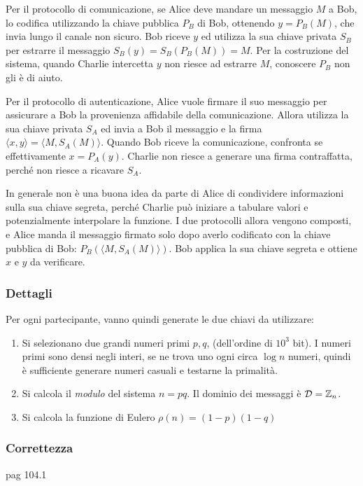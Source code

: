 Per il protocollo di comunicazione, se Alice deve mandare un messaggio $M$ a Bob,
lo codifica utilizzando la chiave pubblica $P_B$ di Bob, ottenendo $
y = P_B(M)
$, che invia lungo il canale non sicuro.
Bob riceve $y$ ed utilizza la sua chiave privata $S_B$ per estrarre il messaggio $
S_B(y) = 
S_B \left( P_B \left( M \right) \right) = M
$.
Per la costruzione del sistema, quando Charlie intercetta $y$ non riesce ad estrarre $M$, conoscere $P_B$ non gli è di aiuto.

Per il protocollo di autenticazione, Alice vuole firmare il suo messaggio per assicurare a Bob la provenienza affidabile della comunicazione. Allora utilizza la sua chiave privata $S_A$ ed invia a Bob il messaggio e la firma $
\langle x, y \rangle
=
\langle M, S_A(M) \rangle
$. Quando Bob riceve la comunicazione, confronta se effettivamente $
x = P_A(y)
$.
Charlie non riesce a generare una firma contraffatta, perché non riesce a ricavare $S_A$.

In generale non è una buona idea da parte di Alice di condividere informazioni sulla sua chiave segreta, perché Charlie può iniziare a tabulare valori e potenzialmente interpolare la funzione.
I due protocolli allora vengono composti, e Alice manda il messaggio firmato solo dopo averlo codificato con la chiave pubblica di Bob: $
P_B \left( 
\langle M, S_A(M) \rangle
\right)
$. Bob applica la sua chiave segreta e ottiene $x$ e $y$ da verificare.

\subsubsection{Dettagli}

Per ogni partecipante, vanno quindi generate le due chiavi da utilizzare:
\begin{enumerate}
    \item Si selezionano due grandi numeri primi $p,q$, (dell'ordine di $10^3$ bit).
        I numeri primi sono densi negli interi, se ne trova uno ogni circa $\log n$ numeri, quindi è sufficiente generare numeri casuali e testarne la primalità.
    \item Si calcola il \emph{modulo} del sistema $n = pq$. Il dominio dei messaggi è $\mathcal{D} =  \mathbb{Z}_{n} $.
    \item Si calcola la funzione di Eulero $\rho(n) = \left( 1-p \right) \left( 1-q \right) $
\end{enumerate}

\subsubsection{Correttezza}
pag 104.1

